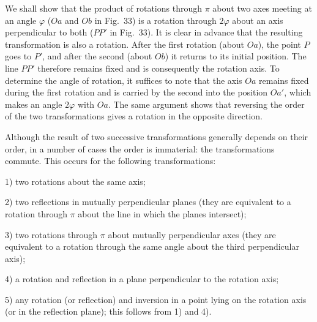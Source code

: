 We shall show that the product of rotations through $\pi$ about two axes meeting at an angle $\varphi$ ($Oa$ and $Ob$ in Fig.~33) is a rotation through $2\varphi$ about an axis perpendicular to both ($PP'$ in Fig.~33). It is clear in advance that the resulting transformation is also a rotation. After the first rotation (about $Oa$), the point $P$ goes to $P'$, and after the second (about $Ob$) it returns to its initial position. The line $PP'$ therefore remains fixed and is consequently the rotation axis. To determine the angle of rotation, it suffices to note that the axis $Oa$ remains fixed during the first rotation and is carried by the second into the position $Oa'$, which makes an angle $2\varphi$ with $Oa$. The same argument shows that reversing the order of the two transformations gives a rotation in the opposite direction.

\begin{figure}[ht]
\centering
{}
\caption{}
\label{fig:91-33}
\end{figure}

Although the result of two successive transformations generally depends on their order, in a number of cases the order is immaterial: the transformations commute. This occurs for the following transformations:

1) two rotations about the same axis;

2) two reflections in mutually perpendicular planes (they are equivalent to a rotation through $\pi$ about the line in which the planes intersect);

3) two rotations through $\pi$ about mutually perpendicular axes (they are equivalent to a rotation through the same angle about the third perpendicular axis);

4) a rotation and reflection in a plane perpendicular to the rotation axis;

5) any rotation (or reflection) and inversion in a point lying on the rotation axis (or in the reflection plane); this follows from 1) and 4).
